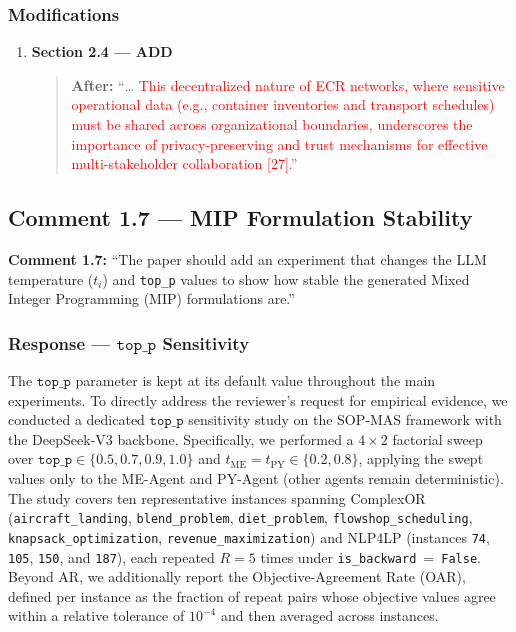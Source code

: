\documentclass[11pt,a4paper]{article}
\begin{document}
\subsubsection{Modifications}
\begin{enumerate}
\item \textbf{Section 2.4 --- ADD}
\begin{quote}
\textbf{After:} ``\ldots{} \textcolor{red}{This decentralized nature of ECR networks, where sensitive operational data (e.g., container inventories and transport schedules) must be shared across organizational boundaries, underscores the importance of privacy-preserving and trust mechanisms for effective multi-stakeholder collaboration [27].}''\end{quote}
\end{enumerate}




\subsection{Comment 1.7 --- MIP Formulation Stability}
\textbf{Comment 1.7: }``The paper should add an experiment that changes the LLM temperature ($t_i$) and \texttt{top\_p} values to show how stable the generated Mixed Integer Programming (MIP) formulations are.''

\subsubsection{Response --- $\texttt{top\_p}$ Sensitivity}

The $\texttt{top\_p}$ parameter is kept at its default value throughout the main experiments. To directly address the reviewer's request for empirical evidence, we conducted a dedicated $\texttt{top\_p}$ sensitivity study on the SOP-MAS framework with the DeepSeek-V3 backbone. Specifically, we performed a $4 \times 2$ factorial sweep over $\texttt{top\_p} \in \{0.5, 0.7, 0.9, 1.0\}$ and $t_\text{ME} = t_\text{PY} \in \{0.2, 0.8\}$, applying the swept values only to the ME-Agent and PY-Agent (other agents remain deterministic). The study covers ten representative instances spanning ComplexOR (\texttt{aircraft\_landing}, \texttt{blend\_problem}, \texttt{diet\_problem}, \texttt{flowshop\_scheduling}, \texttt{knapsack\_optimization}, \texttt{revenue\_maximization}) and NLP4LP (instances \texttt{74}, \texttt{105}, \texttt{150}, and \texttt{187}), each repeated $R{=}5$ times under \texttt{is\_backward}~=~\texttt{False}. Beyond AR, we additionally report the Objective-Agreement Rate (OAR), defined per instance as the fraction of repeat pairs whose objective values agree within a relative tolerance of $10^{-4}$ and then averaged across instances.
\end{document}
